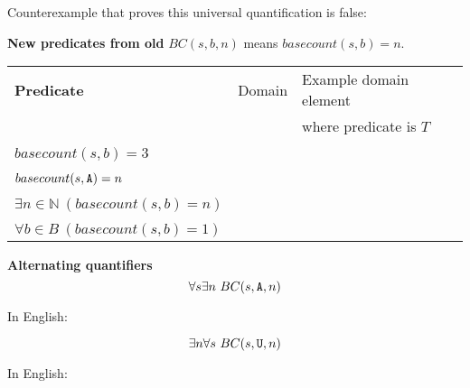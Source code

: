 \documentclass[12pt, oneside]{article}
\begin{document}
Counterexample that proves this universal quantification is false: \underline{\phantom{$(\G\G, \A, 2)$ or $(\G\A\U\G, \G, 3)$)}}


{\bf New predicates from old} \qquad $BC(s,b,n)$ means $basecount(s,b) = n$.
\begin{center}
\begin{tabular}{|p{2.5in}p{1.5in}p{2in}|}
\hline
{\bf Predicate} & Domain &  Example domain element \\
& & where predicate is $T$\\
\hline
&& \\
$basecount(s,b) = 3$ & \phantom{$S \times B$}& 
\phantom{$(\A\U\A\A, \A)$}\\
\hline
&& \\
$basecount(s,\texttt{A}) = n $&\phantom{$S \times \mathbb{N}$} & 
\phantom{$(\A\U\A,2)$}\\
\hline
&& \\
$\exists n \in \mathbb{N} ~(basecount(s,b) = n) $&\phantom{$S \times \mathbb{N}$} & 
\phantom{$(\A\U\A,2)$}\\
\hline
&& \\
$\forall b \in B ~(basecount(s,b) = 1) $&\phantom{$S$} & 
\phantom{$\A\C\G\U$}\\
\hline
\end{tabular}
\end{center}


{\bf Alternating quantifiers}
$$\forall s \exists n ~BC(s,\texttt{A},n)$$

In English: \underline{\phantom{\hspace{3in}}}

\vfill

$$\exists n \forall s ~BC(s,\texttt{U},n)$$

In English: \underline{\phantom{\hspace{3in}}}


\vfill
\newpage
\end{document}
